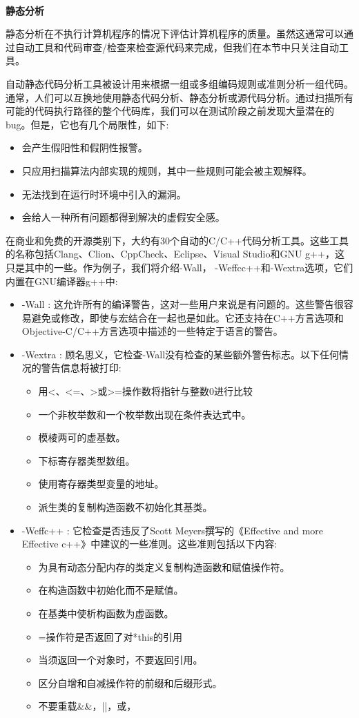 \noindent\textbf{}\ \par
\textbf{静态分析} \ \par
静态分析在不执行计算机程序的情况下评估计算机程序的质量。虽然这通常可以通过自动工具和代码审查/检查来检查源代码来完成，但我们在本节中只关注自动工具。 \par
自动静态代码分析工具被设计用来根据一组或多组编码规则或准则分析一组代码。通常，人们可以互换地使用静态代码分析、静态分析或源代码分析。通过扫描所有可能的代码执行路径的整个代码库，我们可以在测试阶段之前发现大量潜在的bug。但是，它也有几个局限性，如下: \par
\begin{itemize}
	\item 会产生假阳性和假阴性报警。
	\item 只应用扫描算法内部实现的规则，其中一些规则可能会被主观解释。
	\item 无法找到在运行时环境中引入的漏洞。
	\item 会给人一种所有问题都得到解决的虚假安全感。
\end{itemize}

在商业和免费的开源类别下，大约有30个自动的C/C++代码分析工具。这些工具的名称包括Clang、Clion、CppCheck、Eclipse、Visual Studio和GNU g++，这只是其中的一些。作为例子，我们将介绍-Wall， -Weffcc++和-Wextra选项，它们内置在GNU编译器g++中: \par
\begin{itemize}
	\item -Wall : 这允许所有的编译警告，这对一些用户来说是有问题的。这些警告很容易避免或修改，即使与宏结合在一起也是如此。它还支持在C++方言选项和Objective-C/C++方言选项中描述的一些特定于语言的警告。
	\item -Wextra : 顾名思义，它检查-Wall没有检查的某些额外警告标志。以下任何情况的警告信息将被打印:
	\begin{itemize}
		\item 用<、<=、>或>=操作数将指针与整数0进行比较
		\item 一个非枚举数和一个枚举数出现在条件表达式中。
		\item 模棱两可的虚基数。
		\item 下标寄存器类型数组。
		\item 使用寄存器类型变量的地址。
		\item 派生类的复制构造函数不初始化其基类。
	\end{itemize}
	\item -Weffc++ : 它检查是否违反了Scott Meyers撰写的《Effective and more Effective c++》中建议的一些准则。这些准则包括以下内容:
	\begin{itemize}
		\item 为具有动态分配内存的类定义复制构造函数和赋值操作符。
		\item 在构造函数中初始化而不是赋值。
		\item 在基类中使析构函数为虚函数。
		\item =操作符是否返回了对*this的引用
		\item 当须返回一个对象时，不要返回引用。
		\item 区分自增和自减操作符的前缀和后缀形式。
		\item 不要重载\&\&，||，或，
	\end{itemize}
\end{itemize}

